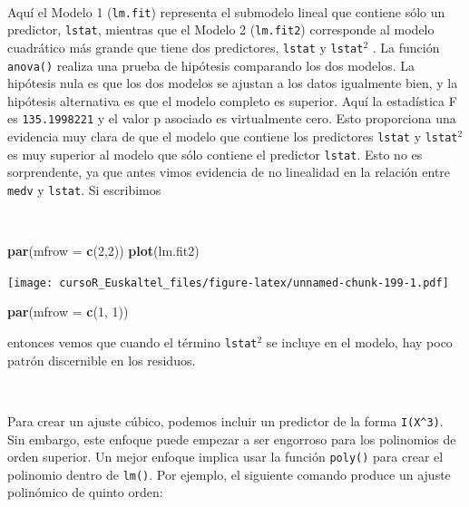\documentclass[]{book}
\newenvironment{Shaded}{\begin{snugshade}}{\end{snugshade}}
\newcommand{\KeywordTok}[1]{\textcolor[rgb]{0.13,0.29,0.53}{\textbf{#1}}}
\newcommand{\DataTypeTok}[1]{\textcolor[rgb]{0.13,0.29,0.53}{#1}}
\newcommand{\DecValTok}[1]{\textcolor[rgb]{0.00,0.00,0.81}{#1}}
\newcommand{\NormalTok}[1]{#1}
\begin{document}
~

Aquí el Modelo 1 (\texttt{lm.fit}) representa el submodelo lineal que
contiene sólo un predictor, \texttt{lstat}, mientras que el Modelo 2
(\texttt{lm.fit2}) corresponde al modelo cuadrático más grande que tiene
dos predictores, \texttt{lstat} y \texttt{lstat}\(^2\) . La función
\texttt{anova()} realiza una prueba de hipótesis comparando los dos
modelos. La hipótesis nula es que los dos modelos se ajustan a los datos
igualmente bien, y la hipótesis alternativa es que el modelo completo es
superior. Aquí la estadística F es \texttt{135.1998221} y el valor p
asociado es virtualmente cero. Esto proporciona una evidencia muy clara
de que el modelo que contiene los predictores \texttt{lstat} y
\texttt{lstat}\(^2\) es muy superior al modelo que sólo contiene el
predictor \texttt{lstat}. Esto no es sorprendente, ya que antes vimos
evidencia de no linealidad en la relación entre \texttt{medv} y
\texttt{lstat}. Si escribimos

~

\begin{Shaded}
\begin{Highlighting}[]
\KeywordTok{par}\NormalTok{(}\DataTypeTok{mfrow =} \KeywordTok{c}\NormalTok{(}\DecValTok{2}\NormalTok{,}\DecValTok{2}\NormalTok{))}
\KeywordTok{plot}\NormalTok{(lm.fit2)}
\end{Highlighting}
\end{Shaded}

\texttt{[image: cursoR\_Euskaltel\_files/figure-latex/unnamed-chunk-199-1.pdf]}

\begin{Shaded}
\begin{Highlighting}[]
\KeywordTok{par}\NormalTok{(}\DataTypeTok{mfrow =} \KeywordTok{c}\NormalTok{(}\DecValTok{1}\NormalTok{, }\DecValTok{1}\NormalTok{))}
\end{Highlighting}
\end{Shaded}

entonces vemos que cuando el término \texttt{lstat}\(^2\) se incluye en
el modelo, hay poco patrón discernible en los residuos.

~

Para crear un ajuste cúbico, podemos incluir un predictor de la forma
\texttt{I(X\^{}3)}. Sin embargo, este enfoque puede empezar a ser
engorroso para los polinomios de orden superior. Un mejor enfoque
implica usar la función \texttt{poly()} para crear el polinomio dentro
de \texttt{lm()}. Por ejemplo, el siguiente comando produce un ajuste
polinómico de quinto orden:
\end{document}
